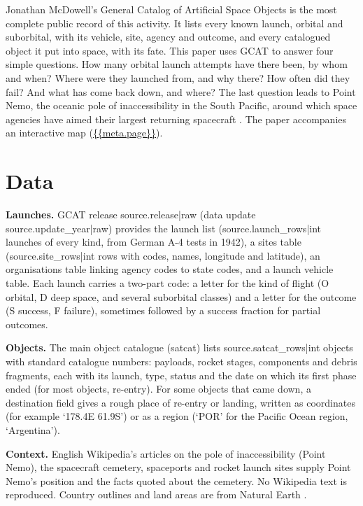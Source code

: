 \documentclass[11pt,a4paper]{article}
\begin{document}
Jonathan McDowell's General Catalog of Artificial Space Objects \citep{gcat} is the most complete public record of this activity. It lists every known launch, orbital and suborbital, with its vehicle, site, agency and outcome, and every catalogued object it put into space, with its fate. This paper uses GCAT to answer four simple questions. How many orbital launch attempts have there been, by whom and when? Where were they launched from, and why there? How often did they fail? And what has come back down, and where? The last question leads to Point Nemo, the oceanic pole of inaccessibility in the South Pacific, around which space agencies have aimed their largest returning spacecraft \citep{wikinemo,wikicem}. The paper accompanies an interactive map (\url{{{meta.page}}}).

\section{Data}
\textbf{Launches.} GCAT release {{source.release|raw}} (data update {{source.update_year|raw}}) provides the launch list ({{source.launch_rows|int}} launches of every kind, from German A-4 tests in 1942), a sites table ({{source.site_rows|int}} rows with codes, names, longitude and latitude), an organisations table linking agency codes to state codes, and a launch vehicle table. Each launch carries a two-part code: a letter for the kind of flight (O orbital, D deep space, and several suborbital classes) and a letter for the outcome (S success, F failure), sometimes followed by a success fraction for partial outcomes.

\textbf{Objects.} The main object catalogue (satcat) lists {{source.satcat_rows|int}} objects with standard catalogue numbers: payloads, rocket stages, components and debris fragments, each with its launch, type, status and the date on which its first phase ended (for most objects, re-entry). For some objects that came down, a destination field gives a rough place of re-entry or landing, written as coordinates (for example `178.4E 61.9S') or as a region (`POR' for the Pacific Ocean region, `Argentina').

\textbf{Context.} English Wikipedia's articles on the pole of inaccessibility (Point Nemo), the spacecraft cemetery, spaceports and rocket launch sites \citep{wikinemo,wikicem,wikiport,wikilist} supply Point Nemo's position and the facts quoted about the cemetery. No Wikipedia text is reproduced. Country outlines and land areas are from Natural Earth \citep{naturalearth}.
\end{document}

